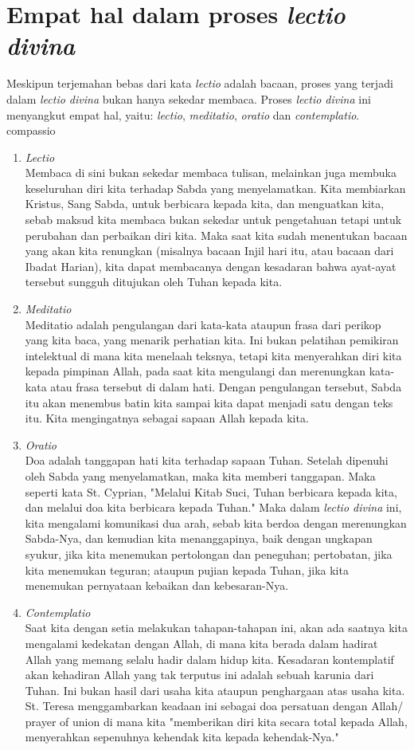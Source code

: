 \section{Empat hal dalam proses \textit{lectio divina}}
Meskipun terjemahan bebas dari kata \textit{lectio} adalah bacaan, proses yang terjadi dalam \textit{lectio divina} bukan hanya sekedar membaca. Proses \textit{lectio divina} ini menyangkut empat hal, yaitu: \textit{lectio}, \textit{meditatio}, \textit{oratio} dan \textit{contemplatio}.
compassio
\begin{enumerate}[label=\alph*.]
\item \textit{Lectio}
\\
Membaca di sini bukan sekedar membaca tulisan, melainkan juga membuka keseluruhan diri kita terhadap Sabda yang menyelamatkan. Kita membiarkan Kristus, Sang Sabda, untuk berbicara kepada kita, dan menguatkan kita, sebab maksud kita membaca bukan sekedar untuk pengetahuan tetapi untuk perubahan dan perbaikan diri kita. Maka saat kita sudah menentukan bacaan yang akan kita renungkan (misalnya bacaan Injil hari itu, atau bacaan dari Ibadat Harian), kita dapat membacanya dengan kesadaran bahwa ayat-ayat tersebut sungguh ditujukan oleh Tuhan kepada kita.
\item \textit{Meditatio} \\
Meditatio adalah pengulangan dari kata-kata ataupun frasa dari perikop yang kita baca, yang menarik perhatian kita. Ini bukan pelatihan pemikiran intelektual di mana kita menelaah teksnya, tetapi kita menyerahkan diri kita kepada pimpinan Allah, pada saat kita mengulangi dan merenungkan kata-kata atau frasa tersebut di dalam hati. Dengan pengulangan tersebut, Sabda itu akan menembus batin kita sampai kita dapat menjadi satu dengan teks itu. Kita mengingatnya sebagai sapaan Allah kepada kita.
\item \textit{Oratio}\\
Doa adalah tanggapan hati kita terhadap sapaan Tuhan. Setelah dipenuhi oleh Sabda yang menyelamatkan, maka kita memberi tanggapan. Maka seperti kata St. Cyprian, "Melalui Kitab Suci, Tuhan berbicara kepada kita, dan melalui doa kita berbicara kepada Tuhan." Maka dalam \textit{lectio divina} ini, kita mengalami komunikasi dua arah, sebab kita berdoa dengan merenungkan Sabda-Nya, dan kemudian kita menanggapinya, baik dengan ungkapan syukur, jika kita menemukan pertolongan dan peneguhan; pertobatan, jika kita menemukan teguran; ataupun pujian kepada Tuhan, jika kita menemukan pernyataan kebaikan dan kebesaran-Nya.
\item \textit{Contemplatio}\\
Saat kita dengan setia melakukan tahapan-tahapan ini, akan ada saatnya kita mengalami kedekatan dengan Allah, di mana kita berada dalam hadirat Allah yang memang selalu hadir dalam hidup kita. Kesadaran kontemplatif akan kehadiran Allah yang tak terputus ini adalah sebuah karunia dari Tuhan. Ini bukan hasil dari usaha kita ataupun penghargaan atas usaha kita. St. Teresa menggambarkan keadaan ini sebagai  doa persatuan dengan Allah/ prayer of union di mana kita "memberikan diri kita secara total kepada Allah, menyerahkan sepenuhnya kehendak kita kepada kehendak-Nya."
\end{enumerate}

